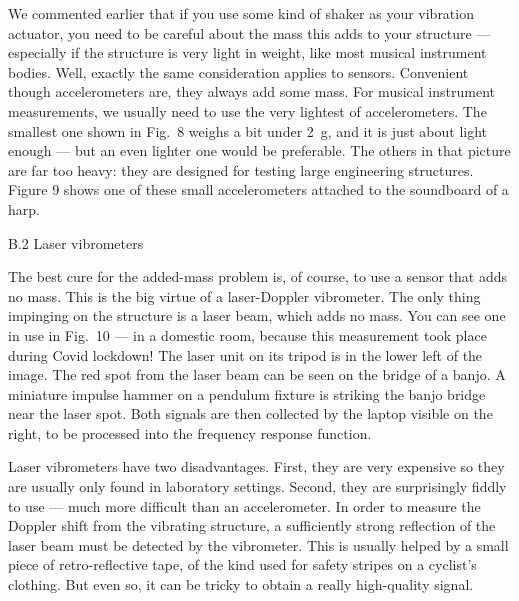   We commented earlier that if you use some kind of shaker as your vibration 
  actuator, you need to be careful about the mass this adds to your structure — 
  especially if the structure is very light in weight, like most musical 
  instrument bodies. Well, exactly the same consideration applies to sensors. 
  Convenient though accelerometers are, they always add some mass. For musical 
  instrument measurements, we usually need to use the very lightest of 
  accelerometers. The smallest one shown in Fig.\ 8 weighs a bit under 2~g, and 
  it is just about light enough --- but an even lighter one would be 
  preferable. The others in that picture are far too heavy: they are designed 
  for testing large engineering structures. Figure 9 shows one of these small 
  accelerometers attached to the soundboard of a harp. 


  B.2 Laser vibrometers 

  The best cure for the added-mass problem is, of course, to use a sensor that 
  adds no mass. This is the big virtue of a laser-Doppler vibrometer. The only 
  thing impinging on the structure is a laser beam, which adds no mass. You can 
  see one in use in Fig.\ 10 — in a domestic room, because this measurement 
  took place during Covid lockdown! The laser unit on its tripod is in the 
  lower left of the image. The red spot from the laser beam can be seen on the 
  bridge of a banjo. A miniature impulse hammer on a pendulum fixture is 
  striking the banjo bridge near the laser spot. Both signals are then 
  collected by the laptop visible on the right, to be processed into the 
  frequency response function. 


  Laser vibrometers have two disadvantages. First, they are very expensive so 
  they are usually only found in laboratory settings. Second, they are 
  surprisingly fiddly to use — much more difficult than an accelerometer. In 
  order to measure the Doppler shift from the vibrating structure, a 
  sufficiently strong reflection of the laser beam must be detected by the 
  vibrometer. This is usually helped by a small piece of retro-reflective tape, 
  of the kind used for safety stripes on a cyclist’s clothing. But even so, it 
  can be tricky to obtain a really high-quality signal. 

